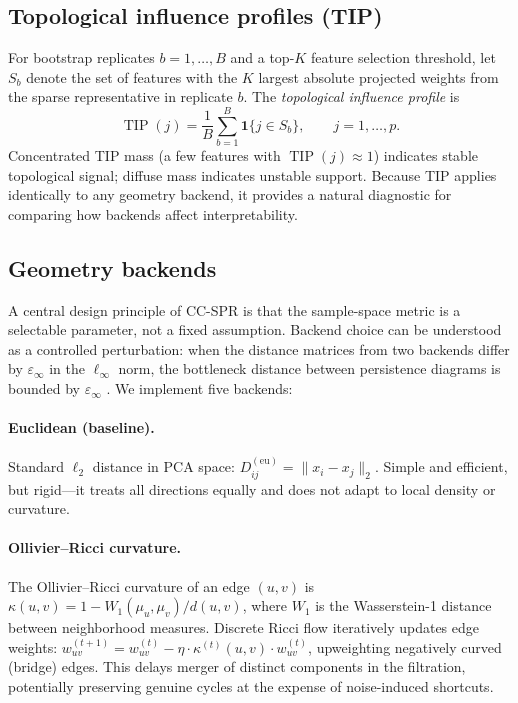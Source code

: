 \documentclass[12pt]{article}
\DeclareMathOperator{\TIP}{TIP}
\begin{document}
\subsection{Topological influence profiles (TIP)}
\label{sec:tip}

For bootstrap replicates $b = 1, \ldots, B$ and a top-$K$ feature selection threshold, let $S_b$ denote the set of features with the $K$ largest absolute projected weights from the sparse representative in replicate $b$.
The \emph{topological influence profile} is
\[
\TIP(j) = \frac{1}{B} \sum_{b=1}^B \mathbf{1}\{j \in S_b\}, \qquad j = 1, \ldots, p.
\]
Concentrated TIP mass (a few features with $\TIP(j) \approx 1$) indicates stable topological signal; diffuse mass indicates unstable support.
Because TIP applies identically to any geometry backend, it provides a natural diagnostic for comparing how backends affect interpretability.

\subsection{Geometry backends}
\label{sec:backends}

A central design principle of CC-SPR is that the sample-space metric is a selectable parameter, not a fixed assumption.
Backend choice can be understood as a controlled perturbation: when the distance matrices from two backends differ by $\varepsilon_\infty$ in the $\ell_\infty$ norm, the bottleneck distance between persistence diagrams is bounded by $\varepsilon_\infty$ \citep{chazal2014persistence}.
We implement five backends:

\paragraph{Euclidean (baseline).}
Standard $\ell_2$ distance in PCA space: $D^{(\text{eu})}_{ij} = \|x_i - x_j\|_2$.
Simple and efficient, but rigid---it treats all directions equally and does not adapt to local density or curvature.

\paragraph{Ollivier--Ricci curvature.}
The Ollivier--Ricci curvature \citep{ollivier2007,ollivier2009} of an edge $(u,v)$ is $\kappa(u,v) = 1 - W_1(\mu_u, \mu_v)/d(u,v)$, where $W_1$ is the Wasserstein-1 distance between neighborhood measures.
Discrete Ricci flow \citep{ni2019community} iteratively updates edge weights: $w_{uv}^{(t+1)} = w_{uv}^{(t)} - \eta \cdot \kappa^{(t)}(u,v) \cdot w_{uv}^{(t)}$, upweighting negatively curved (bridge) edges.
This delays merger of distinct components in the filtration, potentially preserving genuine cycles at the expense of noise-induced shortcuts.
\end{document}
